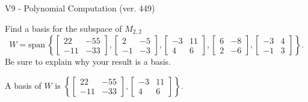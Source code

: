 \begin{exercise}
  \begin{exerciseTitle}V9 - Polynomial Computation (ver. 449)\end{exerciseTitle}
  \begin{exerciseStatement}
    Find a basis for the subspace of \(M_{2,2}\) 
\[W=\mathrm{span}\ \left\{\left[\begin{array}{cc}
22 & -55 \\
-11 & -33
\end{array}\right] , \left[\begin{array}{cc}
2 & -5 \\
-1 & -3
\end{array}\right] , \left[\begin{array}{cc}
-3 & 11 \\
4 & 6
\end{array}\right] , \left[\begin{array}{cc}
6 & -8 \\
2 & -6
\end{array}\right] , \left[\begin{array}{cc}
-3 & 4 \\
-1 & 3
\end{array}\right]\right\}.\]
 Be sure to explain why your result is a basis.


  \end{exerciseStatement}
  \begin{exerciseAnswer}
   A basis of \(W\) is  \(\left\{\left[\begin{array}{cc}
22 & -55 \\
-11 & -33
\end{array}\right] , \left[\begin{array}{cc}
-3 & 11 \\
4 & 6
\end{array}\right]\right\}\).
  


  \end{exerciseAnswer}
\end{exercise}